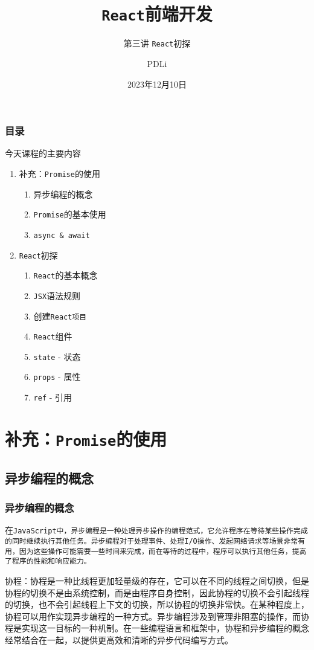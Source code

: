 \documentclass{beamer}
\title{\texttt{React}前端开发}
\subtitle{第三讲 \texttt{React}初探}
\author{PDLi}
\date{2023年12月10日}
\begin{document}
\begin{frame}
  \titlepage
\end{frame}
\begin{frame}
  \frametitle{目录}
  今天课程的主要内容
  \begin{enumerate}
    \item 补充：\texttt{Promise}的使用
          \begin{enumerate}
            \item 异步编程的概念
            \item \texttt{Promise}的基本使用
            \item \texttt{async \& await}
          \end{enumerate}
    \item \texttt{React}初探
          \begin{enumerate}
            \item \texttt{React}的基本概念
            \item \texttt{JSX}语法规则
            \item 创建\tt{React}项目
            \item \texttt{React}组件
            \item \texttt{state} - 状态
            \item \texttt{props} - 属性
            \item \texttt{ref} - 引用
          \end{enumerate}
  \end{enumerate}
\end{frame}

\section{补充：\texttt{Promise}的使用}
\subsection{异步编程的概念}
\begin{frame}
  \frametitle{异步编程的概念}
  在\tt{JavaScript}中，异步编程是一种处理异步操作的编程范式，它允许程序在等待某些操作完成的同时继续执行其他任务。异步编程对于处理事件、处理I/O操作、发起网络请求等场景非常有用，因为这些操作可能需要一些时间来完成，而在等待的过程中，程序可以执行其他任务，提高了程序的性能和响应能力。

  \vspace{1em}

  协程：协程是一种比线程更加轻量级的存在，它可以在不同的线程之间切换，但是协程的切换不是由系统控制，而是由程序自身控制，因此协程的切换不会引起线程的切换，也不会引起线程上下文的切换，所以协程的切换非常快。在某种程度上，协程可以用作实现异步编程的一种方式。异步编程涉及到管理非阻塞的操作，而协程是实现这一目标的一种机制。在一些编程语言和框架中，协程和异步编程的概念经常结合在一起，以提供更高效和清晰的异步代码编写方式。
\end{frame}
\end{document}
